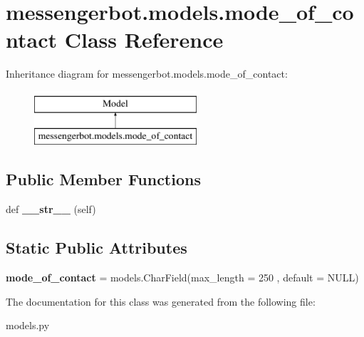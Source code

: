 \hypertarget{classmessengerbot_1_1models_1_1mode__of__contact}{}\section{messengerbot.\+models.\+mode\+\_\+of\+\_\+contact Class Reference}
\label{classmessengerbot_1_1models_1_1mode__of__contact}
Inheritance diagram for messengerbot.\+models.\+mode\+\_\+of\+\_\+contact\+:\begin{figure}[H]
\begin{center}
\leavevmode
\includegraphics[height=2.000000cm]{classmessengerbot_1_1models_1_1mode__of__contact}
\end{center}
\end{figure}
\subsection*{Public Member Functions}
\begin{DoxyCompactItemize}
\item 
\mbox{\label{classmessengerbot_1_1models_1_1mode__of__contact_a6ebd4c5bca4b5fbaa27f327d67b57b18}} 
def {\bfseries \+\_\+\+\_\+str\+\_\+\+\_\+} (self)
\end{DoxyCompactItemize}
\subsection*{Static Public Attributes}
\begin{DoxyCompactItemize}
\item 
\mbox{\label{classmessengerbot_1_1models_1_1mode__of__contact_aad7efb4a0b7b09beb5faae33659984a7}} 
{\bfseries mode\+\_\+of\+\_\+contact} = models.\+Char\+Field(max\+\_\+length = 250 , default = \textquotesingle{}N\+U\+LL\textquotesingle{})
\end{DoxyCompactItemize}


The documentation for this class was generated from the following file\+:\begin{DoxyCompactItemize}
\item 
models.\+py\end{DoxyCompactItemize}
